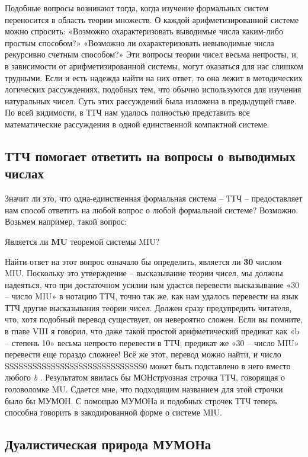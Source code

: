 \documentclass[../main.tex]{subfiles}
\begin{document}
Подобные вопросы возникают тогда, когда изучение формальных систем переносится в область теории множеств. О каждой арифметизированной системе можно спросить: «Возможно охарактеризовать выводимые числа каким-либо простым способом?» «Возможно ли охарактеризовать невыводимые числа рекурсивно счетным способом?» Эти вопросы теории чисел весьма непросты, и, в зависимости от арифметизированной системы, могут оказаться для нас слишком трудными. Если и есть надежда найти на них ответ, то она лежит в методических логических рассуждениях, подобных тем, что обычно используются для изучения натуральных чисел. Суть этих рассуждений была изложена в предыдущей главе. По всей видимости, в ТТЧ нам удалось полностью представить все математические рассуждения в одной единственной компактной системе.


\subsection{ТТЧ помогает ответить на вопросы о выводимых числах}

Значит ли это, что одна-единственная формальная система \--- ТТЧ \--- предоставляет нам способ ответить на любой вопрос о любой формальной системе? Возможно. Возьмем например, такой вопрос:

Является ли \textbf{MU} теоремой системы MIU?

Найти ответ на этот вопрос означало бы определить, является ли \textbf{30} числом MIU. Поскольку это утверждение \--- высказывание теории чисел, мы должны надеяться, что при достаточном усилии нам удастся перевести высказывание «30 \--- число MIU» в нотацию ТТЧ, точно так же, как нам удалось перевести на язык ТТЧ другие высказывания теории чисел. Должен сразу предупредить читателя, что, хотя подобный перевод существует, он невероятно сложен. Если вы помните, в главе VIII я говорил, что даже такой простой арифметический предикат как «b \--- степень 10» весьма непросто перевести в ТТЧ; предикат же «30 \--- число MIU» перевести еще гораздо сложнее! Всё же этот, перевод можно найти, и число SSSSSSSSSSSSSSSSSSSSSSSSSSSSSS0 может быть подставлено в него вместо любого \emph{b} . Результатом явилась бы МОНструозная строчка ТТЧ, говорящая о головоломке MU. Сдается мне, что подходящим названием для этой строчки было бы МУМОН. С помощью МУМОНа и подобных строчек ТТЧ теперь способна говорить в закодированной форме о системе MIU.


\subsection{Дуалистическая природа МУМОНа}
\end{document}
